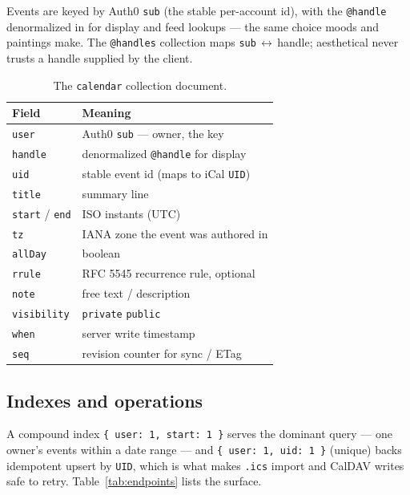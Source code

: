 \documentclass[10pt,letterpaper,twocolumn]{article}
\begin{document}
Events are keyed by Auth0 \texttt{sub} (the stable per-account id), with the \texttt{@handle} denormalized in for display and feed lookups --- the same choice moods and paintings make. The \texttt{@handles} collection maps \texttt{sub}\,$\leftrightarrow$\,handle; aesthetical never trusts a handle supplied by the client.

\begin{table}[h]
\small
\centering
\begin{tabularx}{\columnwidth}{l X}
\toprule
\textbf{Field} & \textbf{Meaning} \\
\midrule
\texttt{user} & Auth0 \texttt{sub} --- owner, the key \\
\texttt{handle} & denormalized \texttt{@handle} for display \\
\texttt{uid} & stable event id (maps to iCal \texttt{UID}) \\
\texttt{title} & summary line \\
\texttt{start} / \texttt{end} & ISO instants (UTC) \\
\texttt{tz} & IANA zone the event was authored in \\
\texttt{allDay} & boolean \\
\texttt{rrule} & RFC 5545 recurrence rule, optional \\
\texttt{note} & free text / description \\
\texttt{visibility} & \texttt{private} \textbar{} \texttt{public} \\
\texttt{when} & server write timestamp \\
\texttt{seq} & revision counter for sync / ETag \\
\bottomrule
\end{tabularx}
\caption{The \texttt{calendar} collection document.}
\label{tab:schema}
\end{table}

\subsection{Indexes and operations}

A compound index \texttt{\{ user: 1, start: 1 \}} serves the dominant query --- one owner's events within a date range --- and \texttt{\{ user: 1, uid: 1 \}} (unique) backs idempotent upsert by \texttt{UID}, which is what makes \texttt{.ics} import and CalDAV writes safe to retry. Table~\ref{tab:endpoints} lists the surface.
\end{document}
